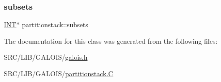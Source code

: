 \mbox{\label{classpartitionstack_a8794938be66ccc79dad9629e654620ae}} 
\subsubsection{\texorpdfstring{subsets}{subsets}}
{\footnotesize\ttfamily \mbox{\hyperlink{galois_8h_a09fddde158a3a20bd2dcadb609de11dc}{I\+NT}}$\ast$ partitionstack\+::subsets}



The documentation for this class was generated from the following files\+:\begin{DoxyCompactItemize}
\item 
S\+R\+C/\+L\+I\+B/\+G\+A\+L\+O\+I\+S/\mbox{\hyperlink{galois_8h}{galois.\+h}}\item 
S\+R\+C/\+L\+I\+B/\+G\+A\+L\+O\+I\+S/\mbox{\hyperlink{partitionstack_8_c}{partitionstack.\+C}}\end{DoxyCompactItemize}
